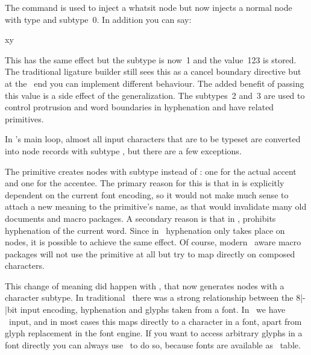 The \type {\noboundary} command is used to inject a whatsit node but now injects
a normal node with type  and subtype~0. In addition you can say:

\starttyping
x\relax y
\stoptyping

This has the same effect but the subtype is now~1 and the value~123 is stored.
The traditional ligature builder still sees this as a cancel boundary directive
but at the \LUA\ end you can implement different behaviour. The added benefit of
passing this value is a side effect of the generalization. The subtypes~2 and~3
are used to control protrusion and word boundaries in hyphenation and have
related primitives.

\stopsection

\startsection[title={The main control loop}]

In \LUATEX's main loop, almost all input characters that are to be typeset are
converted into  node records with subtype , but
there are a few exceptions.

\startitemize[n]

\startitem
    The \type {\accent} primitive creates nodes with subtype 
    instead of : one for the actual accent and one for the
    accentee. The primary reason for this is that \type {\accent} in  is
    explicitly dependent on the current font encoding, so it would not make much
    sense to attach a new meaning to the primitive's name, as that would
    invalidate many old documents and macro packages. A secondary reason is that
    in , \type {\accent} prohibits hyphenation of the current word. Since
    in \LUATEX\ hyphenation only takes place on  nodes, it is
    possible to achieve the same effect. Of course, modern \UNICODE\ aware macro
    packages will not use the \type {\accent} primitive at all but try to map
    directly on composed characters.

    This change of meaning did happen with \type {\char}, that now generates
     nodes with a character subtype. In traditional \TEX\ there was
    a strong relationship between the 8|-|bit input encoding, hyphenation and
    glyphs taken from a font. In \LUATEX\ we have \UTF\ input, and in most cases
    this maps directly to a character in a font, apart from glyph replacement in
    the font engine. If you want to access arbitrary glyphs in a font directly
    you can always use \LUA\ to do so, because fonts are available as \LUA\
    table.
\stopitem

